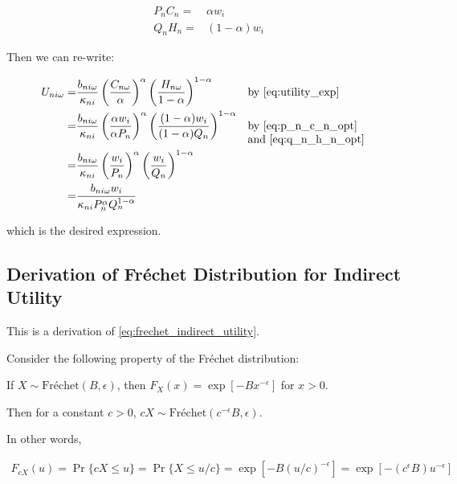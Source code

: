 \documentclass[10pt]{article}
\begin{document}
\begin{align}
    P_n C_n = &\alpha w_i \label{eq:p_n_c_n_opt} \\
    Q_n H_n = &(1-\alpha) w_i \label{eq:q_n_h_n_opt}
\end{align}

Then we can re-write:

\begin{align}
    U_{n i \omega}=&\frac{b_{n i \omega}}{\kappa_{n i}}\left(\frac{C_{n \omega}}{\alpha}\right)^\alpha\left(\frac{H_{n \omega}}{1-\alpha}\right)^{1-\alpha} && \parbox[t]{4cm}{\raggedright by \eqref{eq:utility_exp}} \\
    = &\frac{b_{n i \omega}}{\kappa_{n i}}\left(\frac{\alpha w_i}{\alpha P_n}\right)^\alpha\left(\frac{(1-\alpha) w_i}{(1-\alpha) Q_n}\right)^{1-\alpha} && \parbox[t]{4cm}{\raggedright by \eqref{eq:p_n_c_n_opt} and \eqref{eq:q_n_h_n_opt}} \\
    = &\frac{b_{n i \omega}}{\kappa_{n i}}\left(\frac{w_i}{P_n}\right)^\alpha\left(\frac{w_i}{Q_n}\right)^{1-\alpha} \\
    = &\frac{b_{n i \omega} w_i}{\kappa_{n i} P_n^\alpha Q_n^{1-\alpha}}
\end{align}

which is the desired expression.


\subsection{Derivation of Fréchet Distribution for Indirect Utility}
\label{sec:frechet_indirect_utility}

This is a derivation of \eqref{eq:frechet_indirect_utility}.

Consider the following property of 
the Fréchet distribution:

\begin{notes}
    If $X \sim \text{Fréchet}(B, \epsilon)$, then $F_X(x)=\exp \left[-B x^{-\epsilon}\right]$ for $x>0$.

    Then for a constant $c>0$, $cX \sim \text{Fréchet}\left(c^{-\epsilon} B, \epsilon\right)$.
    
    In other words, 

    \begin{align}
        F_{c X}(u)=\operatorname{Pr}\{c X \leq u\}=\operatorname{Pr}\{X \leq u / c\}=\exp \left[-B(u / c)^{-\epsilon}\right]=\exp \left[-\left(c^{\epsilon} B\right) u^{-\epsilon}\right]
    \end{align}

\end{notes}
\end{document}
